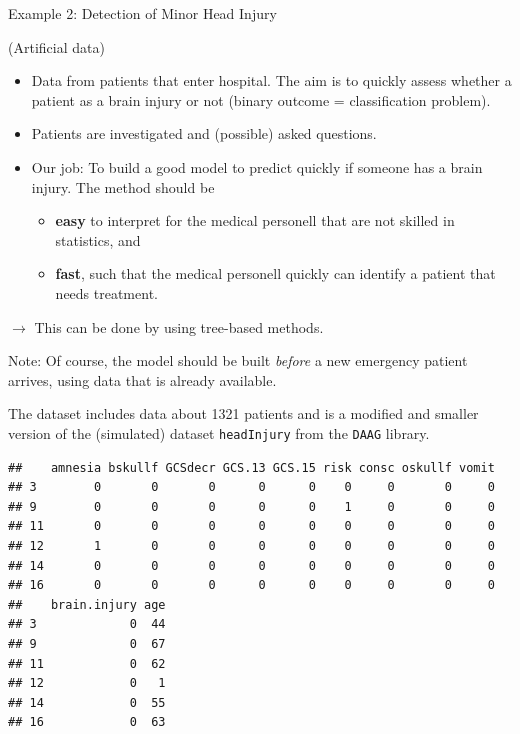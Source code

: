 \documentclass[10pt,ignorenonframetext,]{beamer}
\begin{document}
\begin{frame}

\begin{block}{Example 2: Detection of Minor Head Injury}

\tiny
(Artificial data) \vspace{2mm}

\normalsize

\begin{itemize}
\item
  Data from patients that enter hospital. The aim is to quickly assess
  whether a patient as a brain injury or not (binary outcome =
  classification problem).
\item
  Patients are investigated and (possible) asked questions.
\item
  Our job: To build a good model to predict quickly if someone has a
  brain injury. The method should be

  \begin{itemize}
  \item
    \textbf{easy} to interpret for the medical personell that are not
    skilled in statistics, and
  \item
    \textbf{fast}, such that the medical personell quickly can identify
    a patient that needs treatment.
  \end{itemize}
\end{itemize}

\(\rightarrow\) This can be done by using tree-based methods.

\vspace{4mm}

\small
Note: Of course, the model should be built \emph{before} a new emergency
patient arrives, using data that is already available.

\end{block}

\end{frame}

\begin{frame}[fragile]

The dataset includes data about 1321 patients and is a modified and
smaller version of the (simulated) dataset \texttt{headInjury} from the
\texttt{DAAG} library.

\footnotesize

\begin{verbatim}
##    amnesia bskullf GCSdecr GCS.13 GCS.15 risk consc oskullf vomit
## 3        0       0       0      0      0    0     0       0     0
## 9        0       0       0      0      0    1     0       0     0
## 11       0       0       0      0      0    0     0       0     0
## 12       1       0       0      0      0    0     0       0     0
## 14       0       0       0      0      0    0     0       0     0
## 16       0       0       0      0      0    0     0       0     0
##    brain.injury age
## 3             0  44
## 9             0  67
## 11            0  62
## 12            0   1
## 14            0  55
## 16            0  63
\end{verbatim}

\normalsize

\end{frame}
\end{document}
